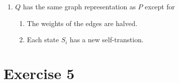 \documentclass[12pt, a4paper]{article} %
\begin{document}
\begin{enumerate}[label=(\alph*)]
\begin{proof}
  , respectively. Then,

    \begin{align}\label{eq:1}
      \begin{split}
      \pi C'_j &= (\pi_1, \pi_2, \ldots, \pi_n) C'_j \\
               &= (\frac{a_{1j} \pi_1}{2}, \ldots, \frac{(1 + a_{jj}) \pi_j}{2}, \ldots, \frac{a_{nj} \pi_n}{2})^T\\
               &= \frac{\pi_j}{2} + \frac{\pi}{2}(a_{1j}, \ldots, a_{nj})^T \\
               &= \frac{\pi_j}{2} + \frac{\pi}{2}C_j \\
      \end{split}
    \end{align}

    and

    \begin{align*}
      \pi_j &= \pi C'_j \\
            &= \frac{\pi_j}{2} + \frac{\pi}{2}C_j\\
            &= \pi C_j \\
    \end{align*}

    In the second equation we used (\ref{eq:1}).

  \end{proof}


  \item\label{item:4c} $Q$ has the same graph representation as $P$ except for

  \begin{enumerate}
    \item The weights of the edges are halved.
    \item Each state $S_i$ has a new self-transtion.
  \end{enumerate}
\end{enumerate}


\section*{Exercise 5}
\label{sec:5}
\end{document}
